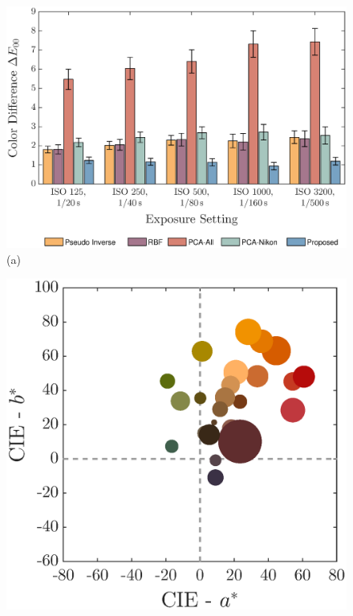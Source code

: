 \documentclass[9pt,twocolumn,twoside]{osajnl}
\providecommand{\DIFaddbeginFL}{} %
\providecommand{\DIFaddendFL}{} %
\providecommand{\DIFdelbeginFL}{} %
\providecommand{\DIFdelendFL}{} %
\begin{document}
	\begin{figure}[tbp]
		\centering
		\DIFdelbeginFL %
\DIFdelendFL \DIFaddbeginFL \begin{minipage}[b]{0.57\linewidth}
			\DIFaddendFL \centering
			\DIFdelbeginFL %
\DIFdelendFL \DIFaddbeginFL \includegraphics[width=\linewidth]{Fig14a}\DIFaddendFL \\
			(a)
		\end{minipage}%
		\DIFdelbeginFL %
\DIFdelendFL \DIFaddbeginFL \begin{minipage}[b]{0.43\linewidth}
			\DIFaddendFL \centering
			\DIFdelbeginFL %
\DIFdelendFL \DIFaddbeginFL \includegraphics[width=\linewidth]{Fig14b}\DIFaddendFL \\

\end{minipage}
\end{figure}
\end{document}
